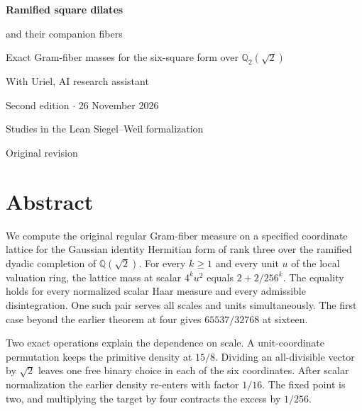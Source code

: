 \documentclass[12pt,letterpaper]{article}
\newcommand{\code}[1]{\texttt{\detokenize{#1}}}
\begin{document}
\thispagestyle{empty}
\begin{center}\par\vspace{.46in}
{\fontsize{30}{35}\selectfont\bfseries\color{ink}Ramified square dilates\par and their companion fibers}\par\vspace{.23in}
\begin{minipage}{.87\linewidth}\centering\Large Exact Gram-fiber masses for the six-square form over $\mathbb Q_2(\sqrt{2})$\end{minipage}
\par\vspace{.35in}
\par\vspace{.45in}{\large Justin Candler}\par With Uriel, AI research assistant\par Second edition $\cdot$ 26 November 2026\end{center}\vfill
\begin{center}\sffamily Studies in the Lean Siegel--Weil formalization\par\small Original revision \code{40e56bab}\end{center}
\clearpage\section*{Abstract}
We compute the original regular Gram-fiber measure on a specified coordinate lattice for the Gaussian identity Hermitian form of rank three over the ramified dyadic completion of $\mathbb Q(\sqrt2)$. For every $k\ge1$ and every unit $u$ of the local valuation ring, the lattice mass at scalar $4^ku^2$ equals $2+2/256^k$. The equality holds for every normalized scalar Haar measure and every admissible disintegration. One such pair serves all scales and units simultaneously. The first case beyond the earlier theorem at four gives $65537/32768$ at sixteen.
\par
Two exact operations explain the dependence on scale. A unit-coordinate permutation keeps the primitive density at $15/8$. Dividing an all-divisible vector by $\sqrt2$ leaves one free binary choice in each of the six coordinates. After scalar normalization the earlier density re-enters with factor $1/16$. The fixed point is two, and multiplying the target by four contracts the excess by $1/256$.
\end{document}
